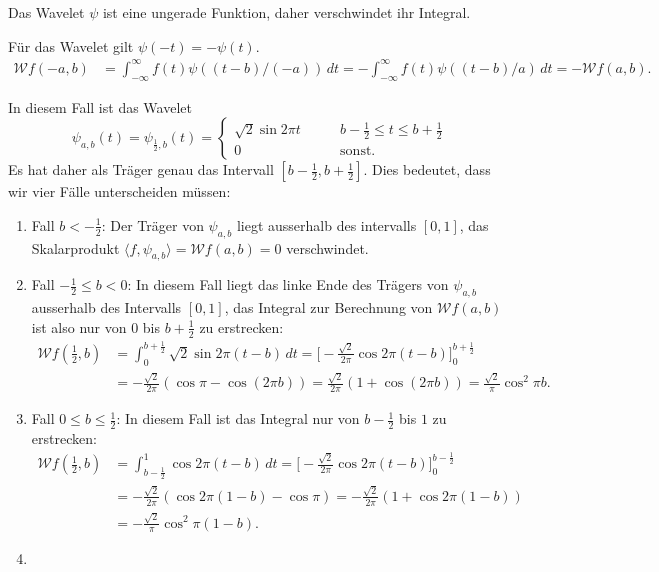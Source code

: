 \begin{loesung}
\begin{teilaufgaben}
%
\item
Das Wavelet $\psi$ ist eine ungerade Funktion, daher verschwindet ihr
Integral.
%
%
\item
Für das Wavelet gilt $\psi(-t)=-\psi(t)$.
\begin{align*}
\mathcal{W}f(-a,b)
&=
\int_{-\infty}^\infty f(t)\psi((t-b)/(-a))\,dt
=
-\int_{-\infty}^\infty f(t)\psi((t-b)/a)\,dt
=
-\mathcal{W}f(a,b).
\end{align*}
%
%
%
\item
In diesem Fall ist das Wavelet
\[
\psi_{a,b}(t)
=
\psi_{\frac12,b}(t)
=
\begin{cases}
\sqrt{2}\sin 2\pi t&\qquad b-\frac12\le t\le b+\frac12
\\
0&\qquad\text{sonst.}
\end{cases}
\]
Es hat daher als Träger genau das Intervall $[b-\frac12,b+\frac12]$.
Dies bedeutet, dass wir vier Fälle unterscheiden müssen:
\begin{enumerate}
\item
Fall $b < -\frac12$:  Der Träger von $\psi_{a,b}$ liegt ausserhalb des
intervalls $[0,1]$, das Skalarprodukt
$\langle f,\psi_{a,b}\rangle=\mathcal{W}f(a,b)=0$ verschwindet.
\item
Fall $-\frac12\le b < 0$: In diesem Fall liegt das linke Ende des Trägers
von $\psi_{a,b}$ ausserhalb des Intervalls $[0,1]$, das Integral zur Berechnung
von $\mathcal{W}f(a,b)$ ist also nur von $0$ bis $b+\frac12$ zu erstrecken:
\begin{align*}
\mathcal{W}f({\textstyle\frac12},b)
&=
\int_{0}^{b+\frac12} \sqrt{2} \sin 2\pi(t-b)\,dt
=
\biggl[
-
\frac{\sqrt{2}}{2\pi}
\cos 2\pi(t-b)
\biggr]_0^{b+\frac12}
\\
&=
-\frac{\sqrt{2}}{2\pi}(\cos\pi - \cos(2\pi b))
=
\frac{\sqrt{2}}{2\pi}(1+\cos(2\pi b))
=
\frac{\sqrt{2}}{\pi}
\cos^2 \pi b.
\end{align*}
\item
Fall $0\le b \le \frac12$: In diesem Fall ist das Integral nur von $b-\frac12$
bis $1$ zu erstrecken:
\begin{align*}
\mathcal{W}f({\textstyle\frac12},b)
&=
\int_{b-\frac12}^1 \cos 2\pi (t-b)\,dt
=
\biggl[
-\frac{\sqrt{2}}{2\pi}\cos 2\pi(t-b)
\biggr]_0^{b-\frac12}
\\
&=
-\frac{\sqrt{2}}{2\pi}(
\cos 2\pi(1-b)
-
\cos \pi
)
=
-\frac{\sqrt{2}}{2\pi}(1+\cos 2\pi(1-b))
\\
&=
-\frac{\sqrt{2}}{\pi}\cos^2\pi(1-b).
\end{align*}
\item

\end{enumerate}
\end{teilaufgaben}
\end{loesung}
